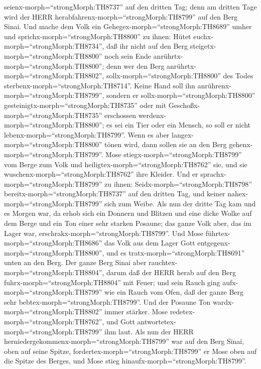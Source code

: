 seienx-morph=``strongMorph:TH8737'' auf den dritten Tag; denn am dritten
Tage wird der HERR herabfahrenx-morph=``strongMorph:TH8799'' auf den
Berg Sinai.  Und mache dem Volk ein
Gehegex-morph=``strongMorph:TH8689'' umher und
sprichx-morph=``strongMorph:TH8800'' zu ihnen: Hütet
euchx-morph=``strongMorph:TH8734'', daß ihr nicht auf den Berg
steigetx-morph=``strongMorph:TH8800'' noch sein Ende
anrührtx-morph=``strongMorph:TH8800''; denn wer den Berg
anrührtx-morph=``strongMorph:TH8802'',
sollx-morph=``strongMorph:TH8800'' des Todes
sterbenx-morph=``strongMorph:TH8714''.  Keine Hand soll ihn
anrührenx-morph=``strongMorph:TH8799'', sondern er
sollx-morph=``strongMorph:TH8800''
gesteinigtx-morph=``strongMorph:TH8735'' oder mit
Geschoßx-morph=``strongMorph:TH8735'' erschossen
werdenx-morph=``strongMorph:TH8800''; es sei ein Tier oder ein Mensch,
so soll er nicht lebenx-morph=``strongMorph:TH8799''. Wenn es aber
langex-morph=``strongMorph:TH8800'' tönen wird, dann sollen sie an den
Berg gehenx-morph=``strongMorph:TH8799''.  Mose
stiegx-morph=``strongMorph:TH8799'' vom Berge zum Volk und
heiligtex-morph=``strongMorph:TH8762'' sie, und sie
wuschenx-morph=``strongMorph:TH8762'' ihre Kleider.  Und er
sprachx-morph=``strongMorph:TH8799'' zu ihnen:
Seidx-morph=``strongMorph:TH8798'' bereitx-morph=``strongMorph:TH8737''
auf den dritten Tag, und keiner nahex-morph=``strongMorph:TH8799'' sich
zum Weibe.  Als nun der dritte Tag kam und es Morgen war,
da erhob sich ein Donnern und Blitzen und eine dicke Wolke auf dem Berge
und ein Ton einer sehr starken Posaune; das ganze Volk aber, das im
Lager war, erschrakx-morph=``strongMorph:TH8799''.  Und
Mose führtex-morph=``strongMorph:TH8686'' das Volk aus dem Lager Gott
entgegenx-morph=``strongMorph:TH8800'', und es
tratx-morph=``strongMorph:TH8691'' unten an den Berg.  Der
ganze Berg Sinai aber rauchtex-morph=``strongMorph:TH8804'', darum daß
der HERR herab auf den Berg fuhrx-morph=``strongMorph:TH8804'' mit
Feuer; und sein Rauch ging aufx-morph=``strongMorph:TH8799'' wie ein
Rauch vom Ofen, daß der ganze Berg sehr
bebtex-morph=``strongMorph:TH8799''.  Und der Posaune Ton
wardx-morph=``strongMorph:TH8802'' immer stärker. Mose
redetex-morph=``strongMorph:TH8762'', und Gott
antwortetex-morph=``strongMorph:TH8799'' ihm laut.  Als nun
der HERR herniedergekommenx-morph=``strongMorph:TH8799'' war auf den
Berg Sinai, oben auf seine Spitze,
fordertex-morph=``strongMorph:TH8799'' er Mose oben auf die Spitze des
Berges, und Mose stieg hinaufx-morph=``strongMorph:TH8799''.
